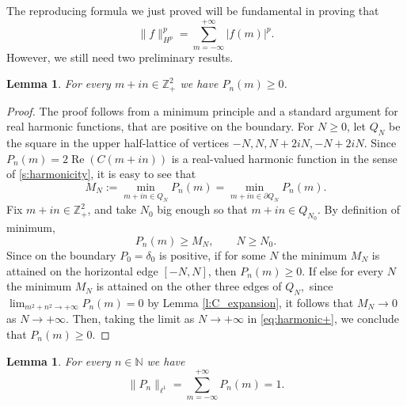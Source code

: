 \documentclass[12pt,a4paper,reqno]{amsart}
\newtheorem{lem}[thm]{Lemma}
\theoremstyle{definition}
\theoremstyle{definition}\newtheorem{defn}[thm]{Definition}
\begin{document}
    The reproducing formula we just proved will be fundamental in proving that 
    \begin{equation}\label{eq:H^p_norm}
    \|f\|^p_{H^p}=\sum_{m=-\infty}^{+\infty}|f(m)|^p.
    \end{equation}
    However, we still need two preliminary results. 
    
    
    \begin{lem}\label{l:Poisson_non_negative}
    For every $m+i n\in\mathbb Z^2_+$ we have
     $P_n(m)\geqslant 0$. 
    \end{lem}
    
    \begin{proof}
    The proof follows from a minimum principle and a standard argument for real harmonic functions, that are positive on the boundary. For $N\geqslant 0$, let $Q_N$ be the square in the upper half-lattice of vertices $-N, N, N+2iN, -N+2iN$. Since $P_n(m)=2\operatorname{Re}(C(m+in))$ is a real-valued harmonic function in the sense of \ref{s:harmonicity}, it is easy to see that 
    \[
    M_N:=\min_{m+in \in Q_N}P_n(m)=\min_{m+in \in \partial Q_N}P_n(m).
    \]
    Fix $m+in\in\mathbb{Z}^2_+$, and take $N_0$ big enough so that $m+in\in Q_{N_0}.$ By definition of minimum, 
    \begin{equation}\label{eq:harmonic+}
        P_n(m)\geqslant M_N, \qquad N\geqslant N_0.
    \end{equation}
    Since on the boundary $P_0=\delta_0$ is positive, if for some $N$ the minimum $M_N$ is attained on the horizontal edge $[-N,N]$, then $P_n(m)\geqslant 0$. If else for every $N$ the minimum $M_N$ is attained on the other three edges of $Q_N,$ since $\lim_{m^2+n^2\to+\infty}P_n(m)=0$ by Lemma \ref{l:C_expansion}, it follows that $M_N\to 0$ as $N\to+\infty$. Then, taking the limit as $N\to+\infty$ in \eqref{eq:harmonic+}, we conclude that $P_n(m)\geqslant 0.$
    \end{proof}
    
    
    
    \begin{lem}\label{l:P_n_norm_1} For every $n\in\mathbb N$ we have
    \[
    \|P_n\|_{\ell^1}=\sum_{m=-\infty}^{+\infty}P_n(m)=1.
    \]
    \end{lem}
    
\end{document}

